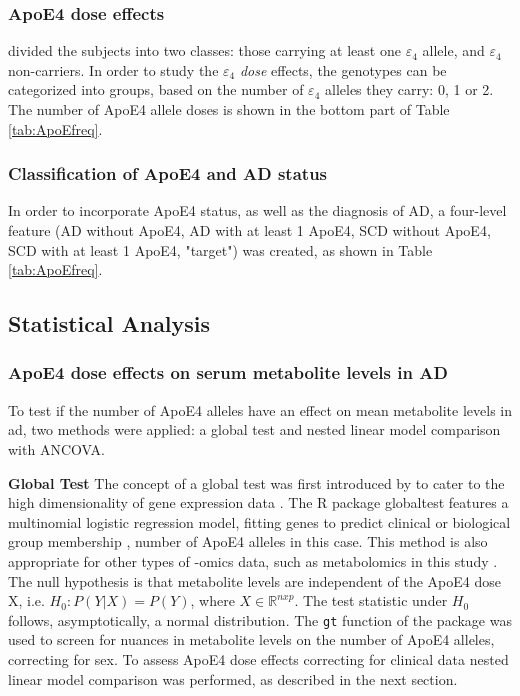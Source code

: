 \documentclass{amsart}
\begin{document}
\subsubsection{ApoE4 dose effects}
\citeauthor{deLeeuw2017Blood-basedDisease} divided the subjects into two classes: those carrying at least one $\varepsilon_4$ allele, and $\varepsilon_4$ non-carriers. In order to study the $\varepsilon_4$ \textit{dose} effects, the genotypes can be categorized into groups, based on the number of $\varepsilon_4$ alleles they carry: 0, 1 or 2. The number of ApoE4 allele doses is shown in the bottom part of Table \ref{tab:ApoEfreq}.

\subsubsection{Classification of ApoE4 and AD status}
In order to incorporate ApoE4 status, as well as the diagnosis of AD, a four-level feature (AD without ApoE4, AD with at least 1 ApoE4, SCD without ApoE4, SCD with at least 1 ApoE4, "target") was created, as shown in Table \ref{tab:ApoEfreq}.

\newpage \subsection{Statistical Analysis} \label{stats}
\subsubsection{ApoE4 dose effects on serum metabolite levels in AD} \label{rq1}
To test if the number of ApoE4 alleles have an effect on mean metabolite levels in \acrshort{ad}, two methods were applied: a global test and nested linear model comparison with ANCOVA.

\leavevmode\newline\textbf{Global Test}\hspace{.25cm} The concept of a global test was first introduced by \citeauthor{Simon2004DesignHealth} to cater to the high dimensionality of gene expression data \cite{Simon2004DesignHealth}. The R package \textsf{globaltest} features a multinomial logistic regression model, fitting genes to predict clinical or biological group membership \cite{Goeman2004AOutcome, Goeman2006TestingAlternative, Goeman2023ThePackage}, number of ApoE4 alleles in this case. This method is also appropriate for other types of -omics data, such as metabolomics in this study \cite{Goeman2023ThePackage}. The null hypothesis is that metabolite levels are independent of the ApoE4 dose X, i.e. $H_0 : P(Y|X) = P(Y)$, where $X \in \mathbb{R}^{n x p}$. The test statistic under $H_0$ follows, asymptotically, a normal distribution. The \texttt{gt} function of the package was used to screen for nuances in metabolite levels on the number of ApoE4 alleles, correcting for sex. To assess ApoE4 dose effects correcting for clinical data nested linear model comparison was performed, as described in the next section.
\end{document}
